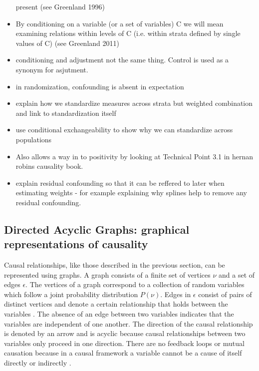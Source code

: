 \documentclass[11pt]{article}
\begin{document}
\begin{itemize}
  present (see Greenland 1996)
\item
  By conditioning on a variable (or a set of variables) C we will mean
  examining relations within levels of C (i.e. within strata defined by
  single values of C) (see Greenland 2011)
\item
  conditioning and adjustment not the same thing. Control is used as a
  synonym for asjutment.
\item
  in randomization, confounding is absent in expectation
\item
  explain how we standardize measures across strata but weighted
  combination and link to standardization itself
\item
  use conditional exchangeability to show why we can standardize across
  populations
\item
  Also allows a way in to positivity by looking at Technical Point 3.1
  in hernan robins causality book.
\item
  explain residual confounding so that it can be reffered to later when
  estimating weights - for example explaining why splines help to remove
  any residual confounding.
\end{itemize}

    \subsection{Directed Acyclic Graphs: graphical representations of
causality}\label{directed-acyclic-graphs-graphical-representations-of-causality}

Causal relationships, like those described in the previous section, can
be represented using graphs. A graph consists of a finite set of
vertices \(\nu\) and a set of edges \(\epsilon\). The vertices of a
graph correspond to a collection of random variables which follow a
joint probability distribution \(P(\nu)\). Edges in \(\epsilon\) consist
of pairs of distinct vertices and denote a certain relationship that
holds between the variables \citet{Pearl2009}. The absence of an edge
between two variables indicates that the variables are independent of
one another. The direction of the causal relationship is denoted by an
arrow and is acyclic because causal relationships between two variables
only proceed in one direction. There are no feedback loops or mutual
causation because in a causal framework a variable cannot be a cause of
itself directly or indirectly \citet{Hernan2004}.\linebreak
\end{document}
